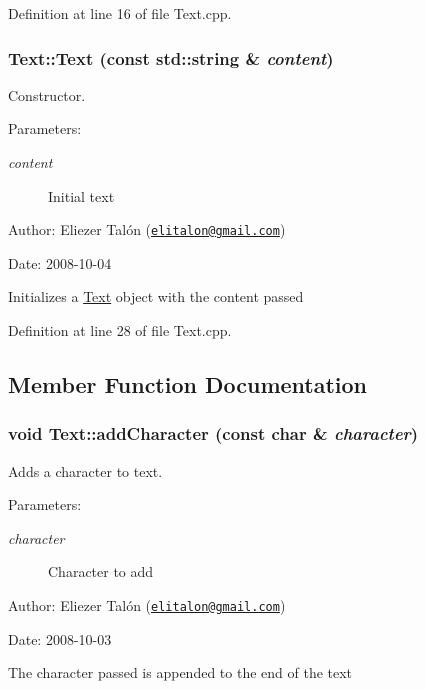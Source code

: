Definition at line 16 of file Text.cpp.\hypertarget{class_text_d8c7b52db022f4351e31b2b7609a8180}{
\subsubsection[Text]{\setlength{\rightskip}{0pt plus 5cm}Text::Text (const std::string \& {\em content})}}
\label{class_text_d8c7b52db022f4351e31b2b7609a8180}


Constructor. 

\begin{Desc}
\item[Parameters:]
\begin{description}
\item[{\em content}]Initial text\end{description}
\end{Desc}
\begin{Desc}
\item[Author:]Eliezer Talón (\href{mailto:elitalon@gmail.com}{\tt elitalon@gmail.com}) \end{Desc}
\begin{Desc}
\item[Date:]2008-10-04\end{Desc}
Initializes a \hyperlink{class_text}{Text} object with the content passed 

Definition at line 28 of file Text.cpp.

\subsection{Member Function Documentation}
\hypertarget{class_text_6e6da63c90af68639adc7dd1336f6bf9}{
\subsubsection[addCharacter]{\setlength{\rightskip}{0pt plus 5cm}void Text::addCharacter (const char \& {\em character})}}
\label{class_text_6e6da63c90af68639adc7dd1336f6bf9}


Adds a character to text. 

\begin{Desc}
\item[Parameters:]
\begin{description}
\item[{\em character}]Character to add\end{description}
\end{Desc}
\begin{Desc}
\item[Author:]Eliezer Talón (\href{mailto:elitalon@gmail.com}{\tt elitalon@gmail.com}) \end{Desc}
\begin{Desc}
\item[Date:]2008-10-03\end{Desc}
The character passed is appended to the end of the text 

